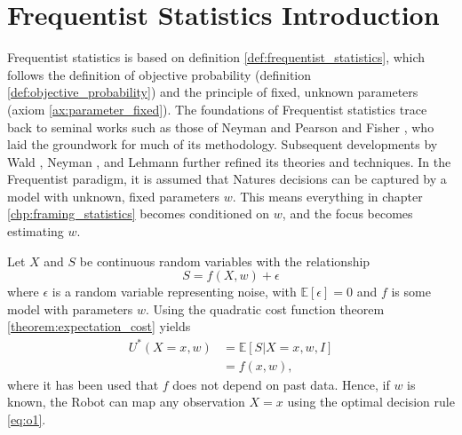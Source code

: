 \chapter{Frequentist Statistics Introduction}
\label{chp:freq}
Frequentist statistics is based on definition \ref{def:frequentist_statistics}, which follows the definition of objective probability (definition \ref{def:objective_probability}) and the principle of fixed, unknown parameters (axiom \ref{ax:parameter_fixed}). The foundations of Frequentist statistics trace back to seminal works such as those of Neyman and Pearson \citep{Neyman1928OnSR} and Fisher \citep{fisher1925statistical}, who laid the groundwork for much of its methodology. Subsequent developments by Wald \citep{Wald1945Sequential}, Neyman \citep{Neyman1948Consistent}, and Lehmann \citep{lehmann1986testing} further refined its theories and techniques.\newline
In the Frequentist paradigm, it is assumed that Natures decisions can be captured by a model with unknown, fixed parameters $w$. This means everything in chapter \ref{chp:framing_statistics} becomes conditioned on $w$, and the focus becomes estimating $w$.

\begin{example}
	Let $X$ and $S$ be continuous random variables with the relationship~\cite{hastie2001}
	\begin{equation}
		S = f(X,w)+\epsilon
	\end{equation}
	where $\epsilon$ is a random variable representing noise, with $\mathbb{E}[\epsilon]=0$ and $f$ is some model with parameters $w$. Using the quadratic cost function theorem \eqref{theorem:expectation_cost} yields
	\begin{equation}
		\label{eq:o1}
		\begin{split}
			U^*(X = x,w) &= \mathbb{E}[S|X=x,w,I]\\
			&= f(x,w),
		\end{split}
	\end{equation}
	where it has been used that $f$ does not depend on past data. Hence, if $w$ is known, the Robot can map any observation $X=x$ using the optimal decision rule \ref{eq:o1}.
\end{example}
